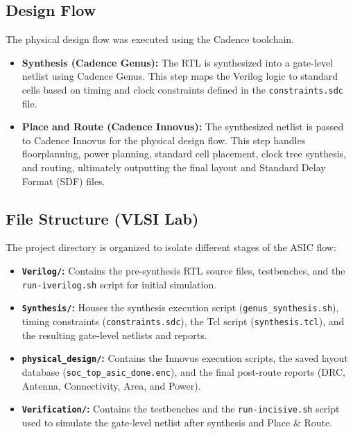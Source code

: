 \documentclass[11pt,a4paper]{article}
\begin{document}
\subsection{Design Flow}
The physical design flow was executed using the Cadence toolchain. %
\begin{itemize}
    \item \textbf{Synthesis (Cadence Genus):} The RTL is synthesized into a gate-level netlist using Cadence Genus. %
    This step maps the Verilog logic to standard cells based on timing and clock constraints defined in the \texttt{constraints.sdc} file. %
    \item \textbf{Place and Route (Cadence Innovus):} The synthesized netlist is passed to Cadence Innovus for the physical design flow. %
    This step handles floorplanning, power planning, standard cell placement, clock tree synthesis, and routing, ultimately outputting the final layout and Standard Delay Format (SDF) files. %
\end{itemize}

\subsection{File Structure (VLSI Lab)}
The project directory is organized to isolate different stages of the ASIC flow:
\begin{itemize}
    \item \textbf{\texttt{Verilog/}:} Contains the pre-synthesis RTL source files, testbenches, and the \texttt{run-iverilog.sh} script for initial simulation. %
    \item \textbf{\texttt{Synthesis/}:} Houses the synthesis execution script (\texttt{genus\_synthesis.sh}), timing constraints (\texttt{constraints.sdc}), the Tcl script (\texttt{synthesis.tcl}), and the resulting gate-level netlists and reports. %
    \item \textbf{\texttt{physical\_design/}:} Contains the Innovus execution scripts, the saved layout database (\texttt{soc\_top\_asic\_done.enc}), and the final post-route reports (DRC, Antenna, Connectivity, Area, and Power). %
    \item \textbf{\texttt{Verification/}:} Contains the testbenches and the \texttt{run-incisive.sh} script used to simulate the gate-level netlist after synthesis and Place \& Route. %
\end{itemize}
\end{document}
